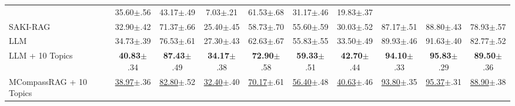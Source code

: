 \begin{table}[h]
{\begin{tabular}{lccccccccc}
      & 35.60{\scriptsize\textcolor{red!70!black}{$\pm$.56}} & 43.17{\scriptsize\textcolor{red!70!black}{$\pm$.49}} & 7.03{\scriptsize\textcolor{red!70!black}{$\pm$.21}}
      & 61.53{\scriptsize\textcolor{red!70!black}{$\pm$.68}} & 31.17{\scriptsize\textcolor{red!70!black}{$\pm$.46}} & 19.83{\scriptsize\textcolor{red!70!black}{$\pm$.37}} \\
    SAKI-RAG
      & 32.90{\scriptsize\textcolor{red!70!black}{$\pm$.42}} & 71.37{\scriptsize\textcolor{red!70!black}{$\pm$.66}} & 25.40{\scriptsize\textcolor{red!70!black}{$\pm$.45}}
      & 58.73{\scriptsize\textcolor{red!70!black}{$\pm$.70}} & 55.60{\scriptsize\textcolor{red!70!black}{$\pm$.59}} & 30.03{\scriptsize\textcolor{red!70!black}{$\pm$.52}}
      & 87.17{\scriptsize\textcolor{red!70!black}{$\pm$.51}} & 88.80{\scriptsize\textcolor{red!70!black}{$\pm$.43}} & 78.93{\scriptsize\textcolor{red!70!black}{$\pm$.57}} \\
    \hline
    LLM
      & 34.73{\scriptsize\textcolor{red!70!black}{$\pm$.39}} & 76.53{\scriptsize\textcolor{red!70!black}{$\pm$.61}} & 27.30{\scriptsize\textcolor{red!70!black}{$\pm$.43}}
      & 62.63{\scriptsize\textcolor{red!70!black}{$\pm$.67}} & 55.83{\scriptsize\textcolor{red!70!black}{$\pm$.55}} & 33.50{\scriptsize\textcolor{red!70!black}{$\pm$.49}}
      & 89.93{\scriptsize\textcolor{red!70!black}{$\pm$.46}} & 91.63{\scriptsize\textcolor{red!70!black}{$\pm$.40}} & 82.77{\scriptsize\textcolor{red!70!black}{$\pm$.52}} \\
    LLM + 10 Topics
      & \textbf{40.83}{\scriptsize\textcolor{red!70!black}{$\pm$.34}} & \textbf{87.43}{\scriptsize\textcolor{red!70!black}{$\pm$.49}} & \textbf{34.17}{\scriptsize\textcolor{red!70!black}{$\pm$.38}}
      & \textbf{72.90}{\scriptsize\textcolor{red!70!black}{$\pm$.58}} & \textbf{59.33}{\scriptsize\textcolor{red!70!black}{$\pm$.51}} & \textbf{42.70}{\scriptsize\textcolor{red!70!black}{$\pm$.44}}
      & \textbf{94.10}{\scriptsize\textcolor{red!70!black}{$\pm$.33}} & \textbf{95.83}{\scriptsize\textcolor{red!70!black}{$\pm$.29}} & \textbf{89.50}{\scriptsize\textcolor{red!70!black}{$\pm$.36}} \\
    \hline
    \rowcolor{oursblue}
    MCompassRAG + 10 Topics
      & \underline{38.97}{\scriptsize\textcolor{red!70!black}{$\pm$.36}} & \underline{82.80}{\scriptsize\textcolor{red!70!black}{$\pm$.52}} & \underline{32.40}{\scriptsize\textcolor{red!70!black}{$\pm$.40}}
      & \underline{70.17}{\scriptsize\textcolor{red!70!black}{$\pm$.61}} & \underline{56.40}{\scriptsize\textcolor{red!70!black}{$\pm$.48}} & \underline{40.63}{\scriptsize\textcolor{red!70!black}{$\pm$.46}}
      & \underline{93.80}{\scriptsize\textcolor{red!70!black}{$\pm$.35}} & \underline{95.37}{\scriptsize\textcolor{red!70!black}{$\pm$.31}} & \underline{88.90}{\scriptsize\textcolor{red!70!black}{$\pm$.38}} \\
    \bottomrule
    \end{tabular}
    }%


\end{table}
